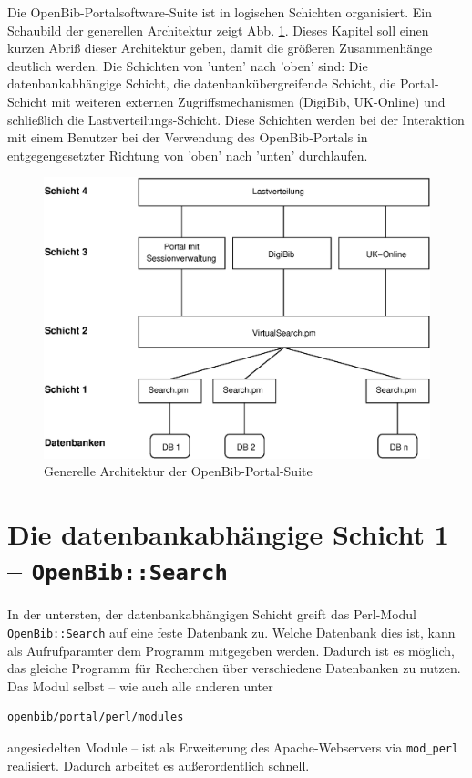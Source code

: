 \documentclass[11pt, twoside, a4paper, BCOR8mm, DIV12, bibtotoc,idxtotoc]{scrbook}
\begin{document}
Die OpenBib-Portalsoftware-Suite ist in logischen Schichten
organisiert. Ein Schaubild der ge\-ne\-rellen Architektur zeigt Abb.
\ref{bild:architektur}. Dieses Kapitel soll einen kurzen Abriß dieser
Architektur geben, damit die größeren Zusammenhänge deutlich
werden. Die Schichten von 'unten' nach 'oben' sind: Die
datenbankabhängige Schicht, die datenbankübergreifende Schicht, die
Portal-Schicht mit weiteren externen Zugriffsmechanismen (DigiBib,
UK-Online) und schließlich die Lastverteilungs-Schicht. Diese
Schichten werden bei der Interaktion mit einem Benutzer bei der
Verwendung des OpenBib-Portals in entgegengesetzter Richtung von
'oben' nach 'unten' durchlaufen.


\begin{figure}
\begin{shadowenv}
  \vspace{4mm}
    \centering \begin{minipage}[b]{1.0\textwidth}
      \centering \includegraphics[width=12cm]{schicht04.eps}
    \end{minipage}
    \caption{Generelle Architektur der OpenBib-Portal-Suite}
  \label{bild:architektur}
  \vspace{3mm}
\end{shadowenv}
\end{figure}

\section{Die datenbankabhängige Schicht 1 -- \texttt{OpenBib::Search}}

In der untersten, der datenbankabhängigen Schicht greift das
Perl-Modul \texttt{OpenBib::Search} auf eine feste Datenbank zu.
Welche Datenbank dies ist, kann als Aufrufparamter dem Programm
mitgegeben werden. Dadurch ist es möglich, das gleiche Programm für
Recherchen über ver\-schie\-de\-ne Daten\-banken zu nutzen. Das Modul
selbst -- wie auch alle anderen unter
\begin{verbatim}
openbib/portal/perl/modules
\end{verbatim}
angesiedelten Module -- ist als Erweiterung des Apache-Webservers via
\texttt{mod\_perl} realisiert.  Dadurch arbeitet es außer\-ordentlich
schnell.
\end{document}

